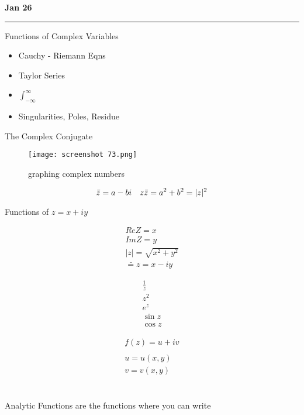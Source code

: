 \documentclass[svgnames]{article}   	%
\begin{document}
\newpage
\noindent \textbf{Jan 26} \hrule
\vspace{10px}
Functions of Complex Variables

\begin{itemize}
  \item Cauchy - Riemann Eqns
  \item Taylor Series
  \item  $\int_{-\infty}^{\infty}$
\end{itemize}
\vspace{5px}
\begin{itemize}
  \item Singularities, Poles, Residue
\end{itemize}

The Complex Conjugate

\begin{figure}[H]
  \centering
    \texttt{[image: screenshot 73.png]}
    \caption{graphing complex numbers}
\end{figure}


\[
\bar z = a - bi \hspace{10px} z \bar z = a^2 + b^2 = |z|^2
\]

Functions of $z = x + iy$ 

\begin{align*}
  ReZ = x \\
  ImZ = y \\
  |z| = \sqrt{x^2 + y^2} \\
  \bar = z = x - iy 
\end{align*}

\begin{tcolorbox}[title = Analytic Functions]

  \begin{align*}
    \frac{1}{z} \\
    z^2 \\
    e^z \\
    \sin z \\
    \cos z
  \end{align*}

\end{tcolorbox}

\begin{align*}
  f(z) = u + iv \\\\
  u = u(x,y) \\
  v = v(x,y) 
\end{align*}\\\\
Analytic Functions are the functions where you can write 
\end{document}
